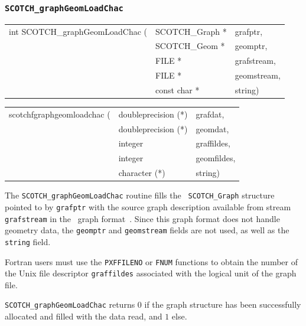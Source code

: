\subsubsection{{\tt SCOTCH\_graphGeomLoadChac}}

\begin{itemize}
\progsyn

{\tt\begin{tabular}{l@{}ll}
int SCOTCH\_graphGeomLoadChac ( & SCOTCH\_Graph * & grafptr, \\
                                & SCOTCH\_Geom *  & geomptr, \\
                                & FILE *          & grafstream, \\
                                & FILE *          & geomstream, \\
                                & const char *    & string)
\end{tabular}}

{\tt\begin{tabular}{l@{}ll}
scotchfgraphgeomloadchac ( & doubleprecision (*) & grafdat,    \\
                           & doubleprecision (*) & geomdat,    \\
                           & integer             & graffildes, \\
                           & integer             & geomfildes, \\
                           & character (*)       & string)
\end{tabular}}

\progdes

The {\tt SCOTCH\_graphGeomLoadChac} routine fills the {\tt
SCOTCH\_\lbt Graph} structure pointed to by {\tt grafptr} with the
source graph description available from stream {\tt graf\lbt stream}
in the \chaco\ graph format~\cite{hele93c}. Since this graph format
does not handle geometry data, the {\tt geomptr} and
{\tt geom\lbt stream} fields are not used, as well as the {\tt string}
field.

Fortran users must use the {\tt PXFFILENO} or {\tt FNUM} functions to
obtain the number of the Unix file descriptor {\tt graf\lbt fildes}
associated with the logical unit of the graph file.

\progret

{\tt SCOTCH\_graphGeomLoadChac} returns $0$ if the graph structure has
been successfully allocated and filled with the data read, and $1$ else.
\end{itemize}

